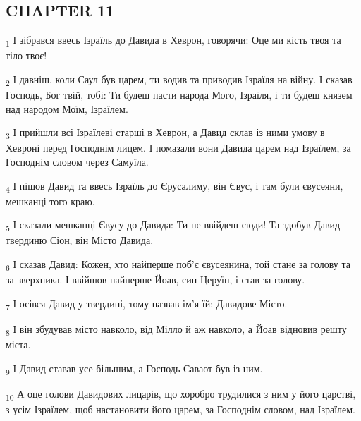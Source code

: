 \subsection{CHAPTER 11}
\begin{tcolorbox}
\textsubscript{1} І зібрався ввесь Ізраїль до Давида в Хеврон, говорячи: Оце ми кість твоя та тіло твоє!
\end{tcolorbox}
\begin{tcolorbox}
\textsubscript{2} І давніш, коли Саул був царем, ти водив та приводив Ізраїля на війну. І сказав Господь, Бог твій, тобі: Ти будеш пасти народа Мого, Ізраїля, і ти будеш князем над народом Моїм, Ізраїлем.
\end{tcolorbox}
\begin{tcolorbox}
\textsubscript{3} І прийшли всі Ізраїлеві старші в Хеврон, а Давид склав із ними умову в Хевроні перед Господнім лицем. І помазали вони Давида царем над Ізраїлем, за Господнім словом через Самуїла.
\end{tcolorbox}
\begin{tcolorbox}
\textsubscript{4} І пішов Давид та ввесь Ізраїль до Єрусалиму, він Євус, і там були євусеяни, мешканці того краю.
\end{tcolorbox}
\begin{tcolorbox}
\textsubscript{5} І сказали мешканці Євусу до Давида: Ти не ввійдеш сюди! Та здобув Давид твердиню Сіон, він Місто Давида.
\end{tcolorbox}
\begin{tcolorbox}
\textsubscript{6} І сказав Давид: Кожен, хто найперше поб'є євусеянина, той стане за голову та за зверхника. І ввійшов найперше Йоав, син Церуїн, і став за голову.
\end{tcolorbox}
\begin{tcolorbox}
\textsubscript{7} І осівся Давид у твердині, тому назвав ім'я їй: Давидове Місто.
\end{tcolorbox}
\begin{tcolorbox}
\textsubscript{8} І він збудував місто навколо, від Мілло й аж навколо, а Йоав відновив решту міста.
\end{tcolorbox}
\begin{tcolorbox}
\textsubscript{9} І Давид ставав усе більшим, а Господь Саваот був із ним.
\end{tcolorbox}
\begin{tcolorbox}
\textsubscript{10} А оце голови Давидових лицарів, що хоробро трудилися з ним у його царстві, з усім Ізраїлем, щоб настановити його царем, за Господнім словом, над Ізраїлем.
\end{tcolorbox}
